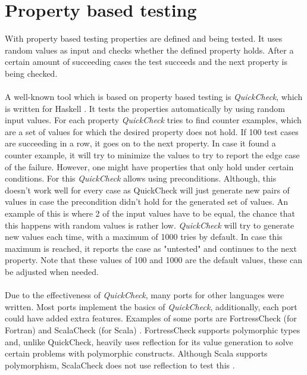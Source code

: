 \section{Property based testing}
With property based testing properties are defined and being tested. It uses random values as input and checks whether the defined property holds. After a certain amount of succeeding cases the test succeeds and the next property is being checked.\\
\\
A well-known tool which is based on property based testing is \textit{QuickCheck}, which is written for Haskell \cite{claessen2011quickcheck}. It tests the properties automatically by using random input values. For each property \textit{QuickCheck} tries to find counter examples, which are a set of values for which the desired property does not hold. If 100 test cases are succeeding in a row, it goes on to the next property. In case it found a counter example, it will try to minimize the values to try to report the edge case of the failure. However, one might have properties that only hold under certain conditions. For this \textit{QuickCheck} allows using preconditions. Although, this doesn't work well for every case as QuickCheck will just generate new pairs of values in case the precondition didn't hold for the generated set of values. An example of this is where 2 of the input values have to be equal, the chance that this happens with random values is rather low. \textit{QuickCheck} will try to generate new values each time, with a maximum of 1000 tries by default. In case this maximum is reached, it reports the case as "untested" and continues to the next property. Note that these values of 100 and 1000 are the default values, these can be adjusted when needed.\\
\\
Due to the effectiveness of \textit{QuickCheck}, many ports for other languages were written. Most ports implement the basics of \textit{QuickCheck}, additionally, each port could have added extra features. Examples of some ports are FortressCheck (for Fortran) \cite{kang2011fortresscheck} and ScalaCheck (for Scala) \cite{siteScalaCheck2015}. FortressCheck supports polymorphic types and, unlike QuickCheck, heavily uses reflection for its value generation to solve certain problems with polymorphic constructs. Although Scala supports polymorphism, ScalaCheck does not use reflection to test this \cite{kang2011fortresscheck}.\\
